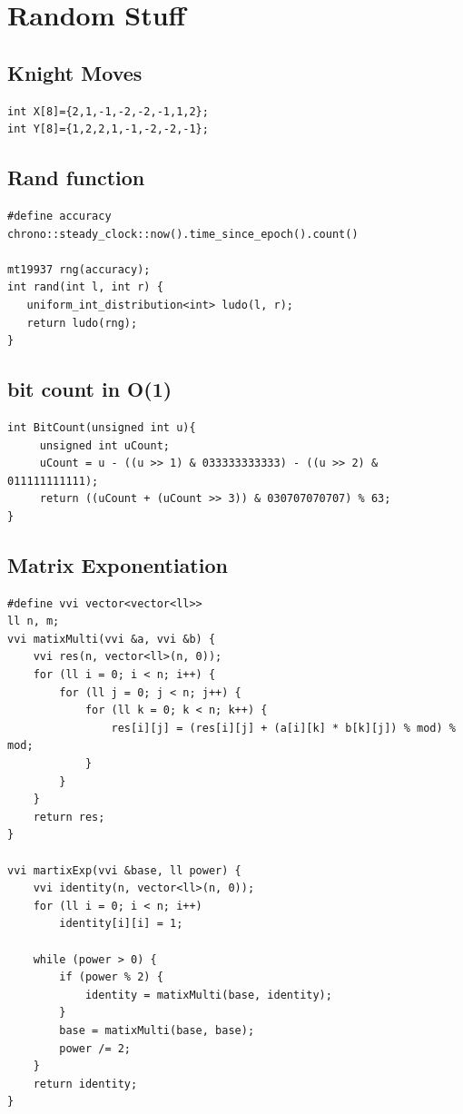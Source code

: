 \section{Random Stuff}
\subsection{Knight Moves}
\begin{lstlisting}
int X[8]={2,1,-1,-2,-2,-1,1,2};
int Y[8]={1,2,2,1,-1,-2,-2,-1};
\end{lstlisting}
\subsection{Rand function}
\begin{lstlisting}
#define accuracy chrono::steady_clock::now().time_since_epoch().count()

mt19937 rng(accuracy);
int rand(int l, int r) {
   uniform_int_distribution<int> ludo(l, r);
   return ludo(rng);
}
\end{lstlisting}
\subsection{bit count in O(1)}
\begin{lstlisting}
int BitCount(unsigned int u){
     unsigned int uCount;
     uCount = u - ((u >> 1) & 033333333333) - ((u >> 2) & 011111111111);
     return ((uCount + (uCount >> 3)) & 030707070707) % 63;
}
\end{lstlisting}
\subsection{Matrix Exponentiation}
\begin{lstlisting}
#define vvi vector<vector<ll>>
ll n, m;
vvi matixMulti(vvi &a, vvi &b) {
    vvi res(n, vector<ll>(n, 0));
    for (ll i = 0; i < n; i++) {
        for (ll j = 0; j < n; j++) {
            for (ll k = 0; k < n; k++) {
                res[i][j] = (res[i][j] + (a[i][k] * b[k][j]) % mod) % mod;
            }
        }
    }
    return res;
}

vvi martixExp(vvi &base, ll power) {
    vvi identity(n, vector<ll>(n, 0));
    for (ll i = 0; i < n; i++)
        identity[i][i] = 1;

    while (power > 0) {
        if (power % 2) {
            identity = matixMulti(base, identity);
        }
        base = matixMulti(base, base);
        power /= 2;
    }
    return identity;
}
\end{lstlisting}
